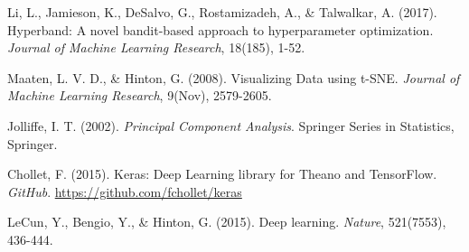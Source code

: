 \documentclass{article}
\begin{document}
\newpage
\begin{thebibliography}{9}
  Li, L., Jamieson, K., DeSalvo, G., Rostamizadeh, A., \& Talwalkar, A. (2017).
  Hyperband: A novel bandit-based approach to hyperparameter optimization.
  \textit{Journal of Machine Learning Research}, 18(185), 1-52.

  Maaten, L. V. D., \& Hinton, G. (2008).
  Visualizing Data using t-SNE.
  \textit{Journal of Machine Learning Research}, 9(Nov), 2579-2605.

  Jolliffe, I. T. (2002).
  \textit{Principal Component Analysis}.
  Springer Series in Statistics, Springer.

  Chollet, F. (2015).
  Keras: Deep Learning library for Theano and TensorFlow.
  \textit{GitHub}.
  \url{https://github.com/fchollet/keras}


  LeCun, Y., Bengio, Y., \& Hinton, G. (2015).
  Deep learning.
  \textit{Nature}, 521(7553), 436-444.





\end{thebibliography}
\end{document}
